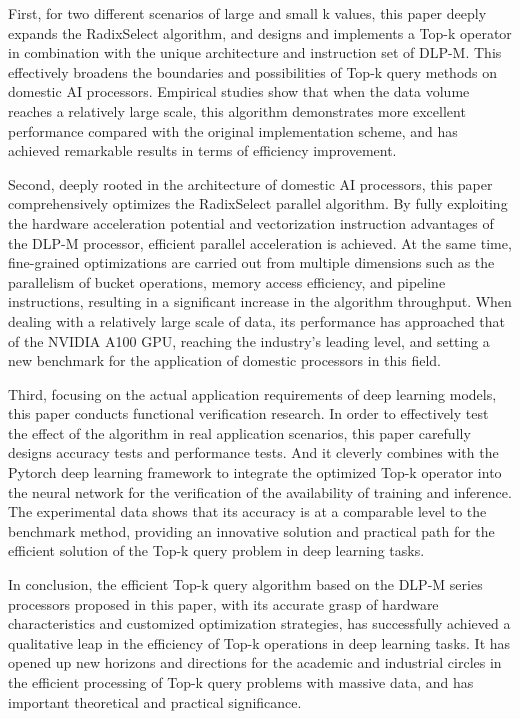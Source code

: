 \begin{abstract*}
  First, for two different scenarios of large and small k values, this paper deeply expands the RadixSelect algorithm, and designs and implements a Top-k operator in combination with the unique architecture and instruction set of DLP-M. This effectively broadens the boundaries and possibilities of Top-k query methods on domestic AI processors. Empirical studies show that when the data volume reaches a relatively large scale, this algorithm demonstrates more excellent performance compared with the original implementation scheme, and has achieved remarkable results in terms of efficiency improvement.
  
  Second, deeply rooted in the architecture of domestic AI processors, this paper comprehensively optimizes the RadixSelect parallel algorithm. By fully exploiting the hardware acceleration potential and vectorization instruction advantages of the DLP-M processor, efficient parallel acceleration is achieved. At the same time, fine-grained optimizations are carried out from multiple dimensions such as the parallelism of bucket operations, memory access efficiency, and pipeline instructions, resulting in a significant increase in the algorithm throughput. When dealing with a relatively large scale of data, its performance has approached that of the NVIDIA A100 GPU, reaching the industry's leading level, and setting a new benchmark for the application of domestic processors in this field.
  
  Third, focusing on the actual application requirements of deep learning models, this paper conducts functional verification research. In order to effectively test the effect of the algorithm in real application scenarios, this paper carefully designs accuracy tests and performance tests. And it cleverly combines with the Pytorch deep learning framework to integrate the optimized Top-k operator into the neural network for the verification of the availability of training and inference. The experimental data shows that its accuracy is at a comparable level to the benchmark method, providing an innovative solution and practical path for the efficient solution of the Top-k query problem in deep learning tasks.
  
  In conclusion, the efficient Top-k query algorithm based on the DLP-M series processors proposed in this paper, with its accurate grasp of hardware characteristics and customized optimization strategies, has successfully achieved a qualitative leap in the efficiency of Top-k operations in deep learning tasks. It has opened up new horizons and directions for the academic and industrial circles in the efficient processing of Top-k query problems with massive data, and has important theoretical and practical significance.
\end{abstract*}
